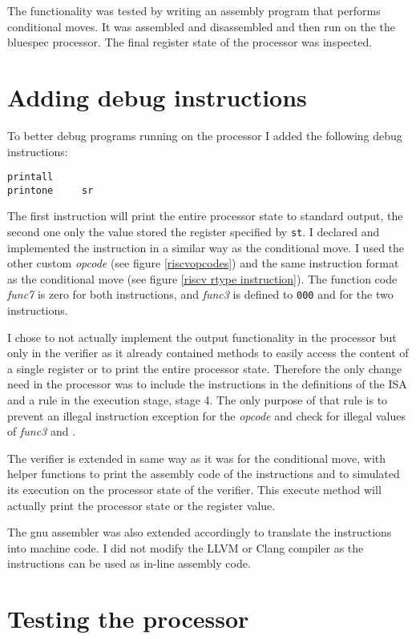 \documentclass[12pt,twoside,notitlepage]{report}
\begin{document}
The functionality was tested by writing an assembly program that performs conditional moves. It was assembled and disassembled and then run on the the bluespec processor. The final register state of the processor was inspected.\\

\section{Adding debug instructions}

To better debug programs running on the processor I added the following debug instructions:
\begin{verbatim}
printall
printone     sr
\end{verbatim}
The first instruction will print the entire processor state to standard output, the second one only the value stored the register specified by \texttt{st}. I declared and implemented the instruction in a similar way as the conditional move. I used the other custom \textit{opcode} (see figure \ref{riscvopcodes}) and the same instruction format as the conditional move (see figure \ref{riscv rtype instruction}). The function code \textit{func7} is zero for both instructions, and \textit{func3} is defined to \texttt{000} and  for the two instructions. 

I chose to not actually implement the output functionality in the processor but only in the verifier as it already contained methods to easily access the content of a single register or to print the entire processor state. Therefore the only change need in the processor was to include the instructions in the definitions of the \gls{ISA} and a rule in the execution stage, stage 4. The only purpose of that rule is to prevent an illegal instruction exception for the \textit{opcode} and check for illegal values of \textit{func3} and .

The verifier is extended in same way as it was for the conditional move, with helper functions to print the assembly code of the instructions and to simulated its execution on the processor state of the verifier. This execute method will actually print the processor state or the register value.

The gnu assembler was also extended accordingly to translate the instructions into machine code. I did not modify the LLVM or Clang compiler as the instructions can be used as in-line assembly code.

\section{Testing the processor}
\end{document}
